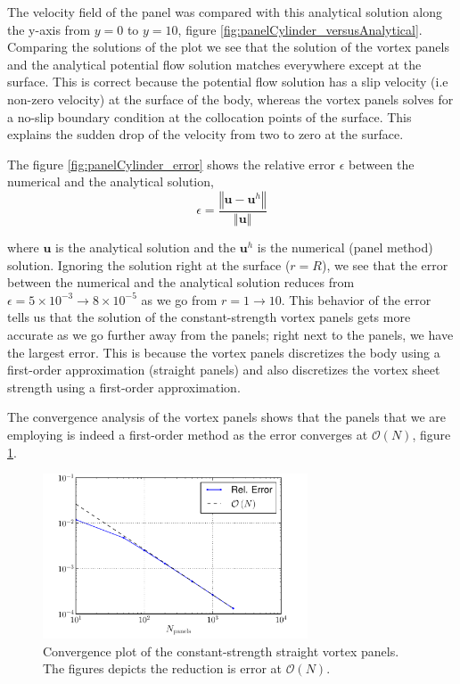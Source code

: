 The velocity field of the panel was compared with this analytical solution along the y-axis from $y=0$ to $y=10$, figure \ref{fig:panelCylinder_versusAnalytical}. Comparing the solutions of the plot we see that the solution of the vortex panels and the analytical potential flow solution matches everywhere except at the surface. This is correct because the potential flow solution has a slip velocity (i.e non-zero velocity) at the surface of the body, whereas the vortex panels solves for a no-slip boundary condition at the collocation points of the surface. This explains the sudden drop of the velocity from two to zero at the surface.	

The figure \ref{fig:panelCylinder_error} shows the relative error $\epsilon$ between the numerical and the analytical solution,
	\begin{equation}
	\epsilon = \frac{\left\Vert\mathbf{u}-\mathbf{u}^h\right\Vert}{\left\Vert\mathbf{u}\right\Vert}
	\label{eq:panelRelativeError}
	\end{equation}
	
where $\mathbf{u}$ is the analytical solution and the $\mathbf{u}^h$ is the numerical (panel method) solution. Ignoring the solution right at the surface ($r=R$), we see that the error between the numerical and the analytical solution reduces from $\epsilon=5\times10^{-3}\rightarrow 8\times10^{-5}$ as we go from $r=1\rightarrow10$. This behavior of the error tells us that the solution of the constant-strength vortex panels gets more accurate as we go further away from the panels; right next to the panels, we have the largest error. This is because the vortex panels discretizes the body using a first-order approximation (straight panels) and also discretizes the vortex sheet strength using a first-order approximation. 

The convergence analysis of the vortex panels shows that the panels that we are employing is indeed a first-order method as the error converges at $\mathcal{O}\left(N\right)$, figure \ref{fig:panelCylinder_convergence}.


	\begin{figure}[!t]
	\centering
	\includegraphics[width=0.7\textwidth]{figures/lagrangian/panelCylinder_convergence.pdf}
	\caption{Convergence plot of the constant-strength straight vortex panels. The figures depicts the reduction is error at $\mathcal{O}\left(N\right)$.}
	\label{fig:panelCylinder_convergence}
	\end{figure}

